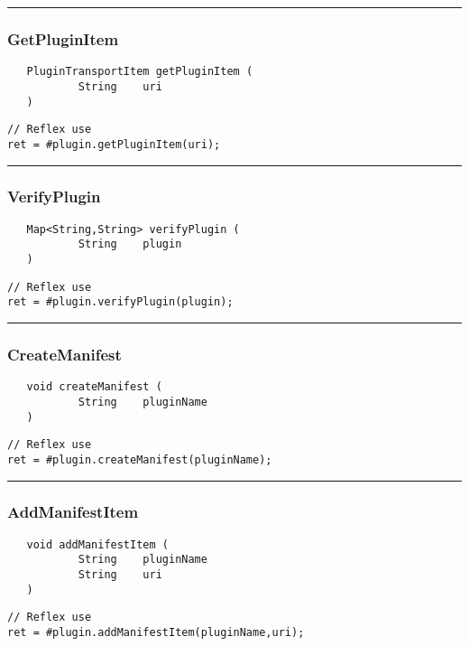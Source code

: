 \rule{15cm}{2pt}
\subsubsection{GetPluginItem}
\label{Api:GetPluginItem}
\begin{verbatim}
   PluginTransportItem getPluginItem (
           String    uri
   )
\end{verbatim}
\begin{lstlisting}[language=reflex]
// Reflex use
ret = #plugin.getPluginItem(uri);
\end{lstlisting}



\rule{15cm}{2pt}
\subsubsection{VerifyPlugin}
\label{Api:VerifyPlugin}
\begin{verbatim}
   Map<String,String> verifyPlugin (
           String    plugin
   )
\end{verbatim}
\begin{lstlisting}[language=reflex]
// Reflex use
ret = #plugin.verifyPlugin(plugin);
\end{lstlisting}



\rule{15cm}{2pt}
\subsubsection{CreateManifest}
\label{Api:CreateManifest}
\begin{verbatim}
   void createManifest (
           String    pluginName
   )
\end{verbatim}
\begin{lstlisting}[language=reflex]
// Reflex use
ret = #plugin.createManifest(pluginName);
\end{lstlisting}



\rule{15cm}{2pt}
\subsubsection{AddManifestItem}
\label{Api:AddManifestItem}
\begin{verbatim}
   void addManifestItem (
           String    pluginName
           String    uri
   )
\end{verbatim}
\begin{lstlisting}[language=reflex]
// Reflex use
ret = #plugin.addManifestItem(pluginName,uri);
\end{lstlisting}



